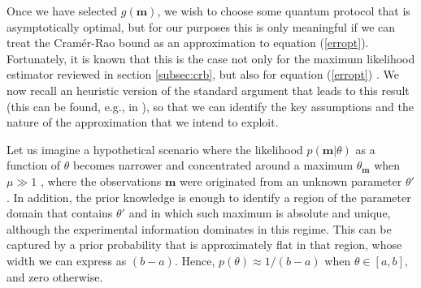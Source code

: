Once we have selected $g(\boldsymbol{m})$, we wish to choose some quantum protocol that is asymptotically optimal, but for our purposes this is only meaningful if we can treat the Cram\'{e}r-Rao bound as an approximation to equation (\ref{erropt}). Fortunately, it is known that this is the case not only for the maximum likelihood estimator reviewed in section \ref{subsec:crb}, but also for equation (\ref{erropt}) \cite{bernardo1994, cox2000}. We now recall an heuristic version of the standard argument that leads to this result (this can be found, e.g., in \cite{jaynes2003, cox2000, bernardo1994}), so that we can identify the key assumptions and the nature of the approximation that we intend to exploit.

Let us imagine a hypothetical scenario where the likelihood $p(\boldsymbol{m}|\theta)$ as a function of $\theta$ becomes narrower and concentrated around a maximum $\theta_{\boldsymbol{m}}$ when $\mu \gg 1$ \cite{cox2000}, where the observations $\boldsymbol{m}$ were originated from an unknown parameter $\theta'$. In addition, the prior knowledge is enough to identify a region of the parameter domain that contains $\theta'$ and in which such maximum is absolute and unique, although the experimental information dominates in this regime. This can be captured by a prior probability that is approximately flat in that region, whose width we can express as $(b-a)$. Hence, $p(\theta) \approx 1/(b-a)$ when $\theta \in [a,b]$, and zero otherwise. 

